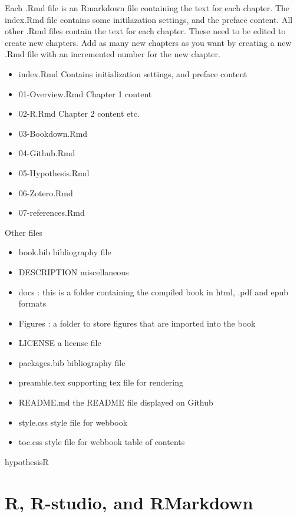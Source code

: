 \documentclass[]{book}
\providecommand{\tightlist}{%
  \setlength{\itemsep}{0pt}\setlength{\parskip}{0pt}}
\theoremstyle{definition}
\theoremstyle{definition}
\theoremstyle{definition}
\theoremstyle{remark}
\begin{document}
Each .Rmd file is an Rmarkdown file containing the text for each
chapter. The index.Rmd file contains some initilazation settings, and
the preface content. All other .Rmd files contain the text for each
chapter. These need to be edited to create new chapters. Add as many new
chapters as you want by creating a new .Rmd file with an incremented
number for the new chapter.

\begin{itemize}
\tightlist
\item
  index.Rmd Contains initialization settings, and preface content
\item
  01-Overview.Rmd Chapter 1 content
\item
  02-R.Rmd Chapter 2 content etc.
\item
  03-Bookdown.Rmd
\item
  04-Github.Rmd
\item
  05-Hypothesis.Rmd
\item
  06-Zotero.Rmd
\item
  07-references.Rmd
\end{itemize}

Other files

\begin{itemize}
\tightlist
\item
  book.bib bibliography file
\item
  DESCRIPTION miscellaneous
\item
  docs : this is a folder containing the compiled book in html, .pdf and
  epub formats
\item
  Figures : a folder to store figures that are imported into the book
\item
  LICENSE a license file
\item
  packages.bib bibliography file
\item
  preamble.tex supporting tex file for rendering
\item
  README.md the README file displayed on Github
\item
  style.css style file for webbook
\item
  toc.css style file for webbook table of contents
\end{itemize}

hypothesisR

\chapter{R, R-studio, and RMarkdown}\label{r-r-studio-and-rmarkdown}
\end{document}
